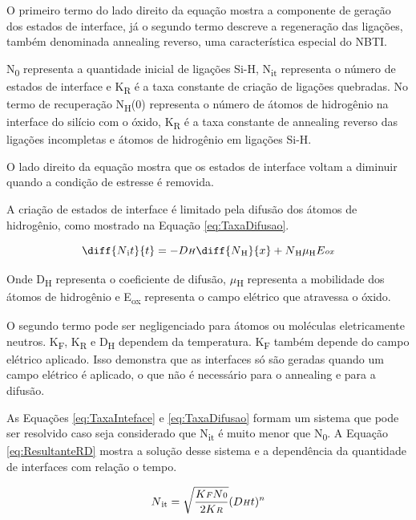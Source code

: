 O primeiro termo do lado direito da equação mostra a componente de geração dos estados de interface, já o segundo termo descreve a regeneração das ligações, também denominada annealing reverso, uma característica especial do NBTI.

N\textsubscript{0} representa a quantidade inicial de ligações Si-H, N\textsubscript{it} representa o número de estados de interface e K\textsubscript{R} é a taxa constante de criação de ligações quebradas. No termo de recuperação N\textsubscript{H}(0) representa o número de átomos de hidrogênio na interface do silício com o óxido, K\textsubscript{R} é a taxa constante de annealing reverso das ligações incompletas e átomos de hidrogênio em ligações Si-H.

O lado direito da equação mostra que os estados de interface voltam a diminuir quando a condição de estresse é removida.

A criação de estados de interface é limitado pela difusão dos átomos de hidrogênio, como mostrado na Equação \ref{eq:TaxaDifusao}.

\begin{equation}
    \label{eq:TaxaDifusao}
    \diff{N{\textsubscript it}}{t} = - D{\scriptstyle H}\diff{N{\textsubscript H}}{x} + N{\textsubscript H}\mu{\textsubscript H}E{\scriptstyle ox}
\end{equation}

Onde D\textsubscript{H} representa o coeficiente de difusão, $\mu$\textsubscript{H} representa a mobilidade dos átomos de hidrogênio e E\textsubscript{ox} representa o campo elétrico que atravessa o óxido.

O segundo termo pode ser negligenciado para átomos ou moléculas eletricamente neutros. K\textsubscript{F}, K\textsubscript{R} e D\textsubscript{H} dependem da temperatura. K\textsubscript{F} também depende do campo elétrico aplicado. Isso demonstra que as interfaces só são geradas quando um campo elétrico é aplicado, o que não é necessário para o annealing e para a difusão.

As Equações \ref{eq:TaxaInteface} e \ref{eq:TaxaDifusao} formam um sistema que pode ser resolvido caso seja considerado que N\textsubscript{it} é muito menor que N\textsubscript{0}. A Equação \ref{eq:ResultanteRD} mostra a solução desse sistema e a dependência da quantidade de interfaces com relação o tempo.

\begin{equation}
    \label{eq:ResultanteRD}
    N{\textsubscript {it}} = \sqrt{\frac{K{\scriptstyle F}N{\scriptstyle 0}}{2K{\scriptstyle R}}}(D{\scriptstyle H}t)^{n}
\end{equation}

